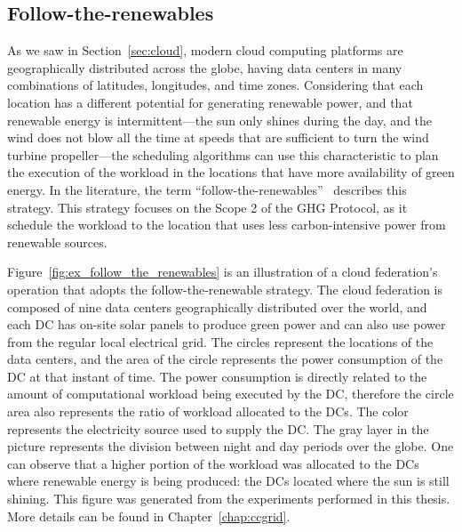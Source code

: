 \subsection{Follow-the-renewables}

\label{sec:followtherenewables}

As we saw in Section~\ref{sec:cloud}, modern cloud computing platforms are geographically distributed across the globe, having data centers in many combinations of latitudes, longitudes, and time zones. Considering that each location has a different potential for generating renewable power, and that renewable energy is intermittent---the sun only shines during the day, and the wind does not blow all the time at speeds that are sufficient to turn the wind turbine propeller---the scheduling algorithms can use this characteristic to plan the execution of the workload in the locations that have more availability of green energy. In the literature, the term ``follow-the-renewables''~\cite{shuja2016sustainable} describes this strategy. This strategy focuses on the Scope 2 of the GHG Protocol, as it schedule the workload to the location that uses less carbon-intensive power from renewable sources.

Figure~\ref{fig:ex_follow_the_renewables} is an illustration of a cloud federation's operation that adopts the follow-the-renewable strategy. The cloud federation is composed of nine data centers geographically distributed over the world, and each DC has on-site solar panels to produce green power and can also use power from the regular local electrical grid. The circles represent the locations of the data centers, and the area of the circle represents the power consumption of the DC at that instant of time. The power consumption is directly related to the amount of computational workload being executed by the DC, therefore the circle area also represents the ratio of workload allocated to the DCs. The color represents the electricity source used to supply the DC. The gray layer in the picture represents the division between night and day periods over the globe. One can observe that a higher portion of the workload was allocated to the DCs where renewable energy is being produced: the DCs located where the sun is still shining. This figure was generated from the experiments performed in this thesis. More details can be found in Chapter~\ref{chap:ccgrid}.

